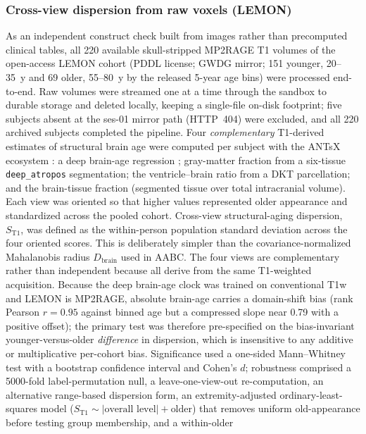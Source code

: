 \documentclass[11pt]{article}
\newcommand{\D}{\ensuremath{D}}
\begin{document}
\subsubsection*{Cross-view dispersion from raw voxels (LEMON)}
As an independent construct check built from images rather than precomputed
clinical tables, all \num{220} available skull-stripped MP2RAGE T1
volumes of the open-access LEMON cohort (PDDL license; GWDG mirror; \num{151} younger, 20--35~y
and \num{69} older, 55--80~y by the released 5-year age bins) were processed end-to-end. Raw
volumes were streamed one at a time through the sandbox to durable storage and deleted locally,
keeping a single-file on-disk footprint; five subjects absent at the ses-01 mirror path
(HTTP~404) were excluded, and all \num{220} archived subjects completed the pipeline. Four
\emph{complementary} T1-derived estimates of structural brain age were computed per subject
with the ANTsX ecosystem \citep{tustison2021antsx}: a deep brain-age regression
\citep{bashyam2020deepbrainnet}; gray-matter fraction from a six-tissue \texttt{deep\_atropos}
segmentation; the ventricle--brain ratio from a DKT parcellation; and the brain-tissue fraction
(segmented tissue over total intracranial volume). Each view was oriented so that
higher values represented older appearance and standardized across the pooled
cohort. Cross-view structural-aging dispersion, $S_{\mathrm{T1}}$, was defined
as the within-person population standard deviation across the four oriented
scores. This is deliberately simpler than the covariance-normalized Mahalanobis
radius $\D_{\text{brain}}$ used in AABC. The four views are complementary rather
than independent because all derive from the same T1-weighted acquisition.
Because the deep brain-age clock was trained on conventional
T1w and LEMON is MP2RAGE, absolute brain-age carries a domain-shift bias (rank Pearson
$r=\num{0.95}$ against binned age but a compressed slope near \num{0.79} with a positive offset);
the primary test was therefore pre-specified on the bias-invariant younger-versus-older
\emph{difference} in dispersion, which is insensitive to any additive or multiplicative
per-cohort bias. Significance used a one-sided Mann--Whitney test with a bootstrap confidence
interval and Cohen's $d$; robustness comprised a 5000-fold label-permutation null, a
leave-one-view-out re-computation, an alternative range-based dispersion form, an
extremity-adjusted ordinary-least-squares model
($S_{\mathrm{T1}}\sim|\text{overall level}|+\text{older}$)
that removes uniform old-appearance before testing group membership, and a within-older
\end{document}
